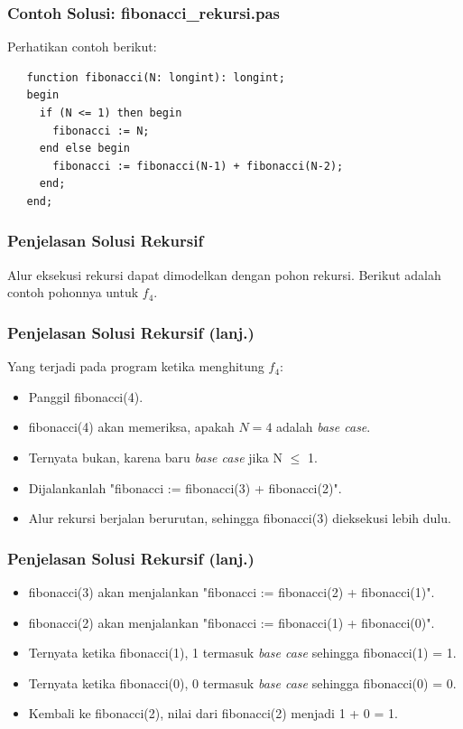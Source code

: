 \begin{frame}[fragile]
\frametitle{Contoh Solusi: fibonacci\_rekursi.pas}
Perhatikan contoh berikut:
\begin{lstlisting}
   function fibonacci(N: longint): longint;
   begin
     if (N <= 1) then begin
       fibonacci := N;
     end else begin
       fibonacci := fibonacci(N-1) + fibonacci(N-2);
     end;
   end;
\end{lstlisting}
\end{frame}

\begin{frame}[fragile]
\frametitle{Penjelasan Solusi Rekursif}
Alur eksekusi rekursi dapat dimodelkan dengan pohon rekursi. Berikut adalah contoh pohonnya untuk $f_4$.
\end{frame}

\begin{frame}
\frametitle{Penjelasan Solusi Rekursif (lanj.)}
Yang terjadi pada program ketika menghitung $f_4$:
\begin {itemize}
  \item Panggil fibonacci(4).
  \item fibonacci(4) akan memeriksa, apakah $N=4$ adalah \textit{base case}.
  \item Ternyata bukan, karena baru \textit{base case} jika N $\le$ 1.
  \item Dijalankanlah "fibonacci := fibonacci(3) + fibonacci(2)".
  \item Alur rekursi berjalan berurutan, sehingga fibonacci(3) dieksekusi lebih dulu.
\end{itemize}
\end{frame}

\begin{frame}
\frametitle{Penjelasan Solusi Rekursif (lanj.)}
\begin{itemize}
  \item fibonacci(3) akan menjalankan "fibonacci := fibonacci(2) + fibonacci(1)".
  \item fibonacci(2) akan menjalankan "fibonacci := fibonacci(1) + fibonacci(0)".
  \item Ternyata ketika fibonacci(1), 1 termasuk \textit{base case} sehingga fibonacci(1) = 1.
  \item Ternyata ketika fibonacci(0), 0 termasuk \textit{base case} sehingga fibonacci(0) = 0.
  \item Kembali ke fibonacci(2), nilai dari fibonacci(2) menjadi 1 + 0 = 1.
\end{itemize}
\end{frame}


